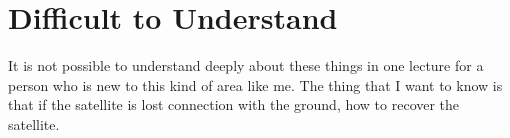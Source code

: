 \section*{Difficult to Understand}
It is not possible to understand deeply about these things in one lecture for a person who is new to this kind of area like me. The thing that I want to know is that if the satellite is lost connection with the ground, how to recover the satellite.